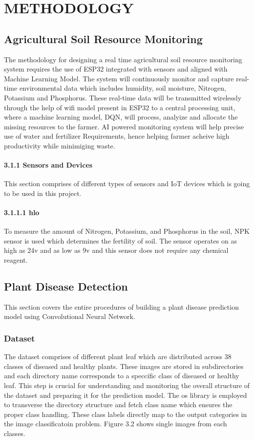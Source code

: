 \setlength{\footskip}{8mm}



\chapter{METHODOLOGY}
\section{Agricultural Soil Resource Monitoring}
The methodology for designing a real time agricultural soil resource monitoring system requires the use of ESP32 integrated with sensors and 
aligned with Machine Learning Model. The system will continuously monitor and capture real-time environmental data which includes humidity,
soil moisture, Nitrogen, Potassium and Phosphorus. These real-time data will be transmitted wirelessly through the help of wifi model present
in ESP32 to a central processing unit, where a machine learning model, DQN, will process, analyize and allocate the missing resources to the 
farmer. AI powered monitoring system will help precise use of water and fertilizer Requirements, hence helping farmer acheive high productivity
while minimiging waste.

\subsubsection{3.1.1 Sensors and Devices}
This section comprises of different types of sensors and IoT devices which is going to be used in this project.
\subsubsection{3.1.1.1 hlo}
To measure the amount of Nitrogen, Potassium, and Phosphorus in the soil, NPK sensor is used which determines the fertility of soil. The sensor
operates on as high as 24v and as low as 9v and this sensor does not require any chemical reagent. 

\section{Plant Disease Detection}
This section covers the entire procedures of building a plant disease prediction model using Convolutional Neural Network.\\


\subsection{Dataset}
The dataset comprises of different plant leaf which are distributed across 38 classes of diseased and healthy plants. These images are stored 
in subdirectories and each directory name corresponds to a speccific class of diseased or healthy leaf. This step is crucial for understanding
and monitoring the overall structure of the dataset and preparing it for the prediction model. The os library is employed to transverse the 
directory  structure and fetch class name which ensures the proper class handling. These class labels directly map to the output categories in the
image classificatoin problem. Figure 3.2 shows single images from each classes. 

